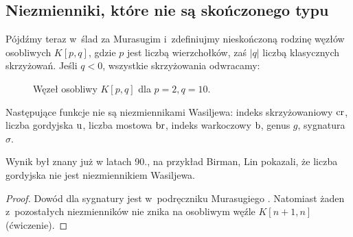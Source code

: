 
\subsection{Niezmienniki, które nie są skończonego typu}
Pójdźmy teraz w~ślad za Murasugim i~zdefiniujmy nieskończoną rodzinę węzłów osobliwych $K[p, q]$, gdzie $p$ jest liczbą wierzchołków, zaś $|q|$ liczbą klasycznych skrzyżowań.
Jeśli $q < 0$, wszystkie skrzyżowania odwracamy:
\begin{figure}[H]
    \centering
\begin{comment}
    \begin{tikzpicture}[baseline=-0.65ex, scale=0.1]
    \begin{knot}[clip width=5, end tolerance=1pt, flip crossing/.list={2}]
        \draw[thick] (5, 0) [in=-60, out=-120] to (-5, 0) [in=60, out=120] to (-15, 0) [in=-60, out=-120] to (-25, 0) [in=60, out=120] to (-35, 0) [in=180, out=-120] to (-35, -10);
        \draw[thick] (5, 0) [in=60, out=120] to (-5, 0) [in=-60, out=-120] to (-15, 0) [in=60, out=120] to (-25, 0) [in=-60, out=-120] to (-35, 0) [in=-180, out=120] to (-35, 10);
        \strand[thick] (5, 0) [in=120, out=60] to (15, 0) [in=-120, out=-60] to (25, 0) [in=120, out=60] to (35, 0) [in=0, out=-60] to (35, -10);
        \strand[thick] (5, 0) [in=-120, out=-60] to (15, 0) [in=120, out=60] to (25, 0) [in=-120, out=-60] to (35, 0) [in=0, out=60] to (35, 10);
        \draw[thick,Latex-] (-35, 10) to (35, 10);
        \draw[thick,Latex-] (-35, -10) to (35, -10);
        \draw[black,fill=black] (5,0) circle (0.5);
        \draw[black,fill=black] (-5,0) circle (0.5);
        \draw[black,fill=black] (-15,0) circle (0.5);
        \draw[black,fill=black] (-25,0) circle (0.5);
        \draw[black,fill=black] (-35,0) circle (0.5);
    \end{knot}
    \end{tikzpicture}
\end{comment}
    \caption{Węzeł osobliwy $K[p, q]$ dla $p = 2, q = 10$.}
\end{figure}

\begin{proposition}
%
%
%
%
%
%
    Następujące funkcje nie są niezmiennikami Wasiljewa: indeks skrzyżowaniowy $\operatorname{cr}$, liczba gordyjska $\operatorname{u}$, liczba mostowa $\operatorname{br}$, indeks warkoczowy $\operatorname{b}$, genus $g$, sygnatura $\sigma$.
\end{proposition}

Wynik był znany już w latach 90., na przykład Birman, Lin \cite{birman1993} pokazali, że liczba gordyjska nie jest niezmiennikiem Wasiljewa.
%
%

\begin{proof}
    Dowód dla sygnatury jest w~podręczniku Murasugiego \cite[s. 312]{murasugi1996}.
    Natomiast żaden z~pozostałych niezmienników nie znika na osobliwym węźle $K[n+1, n]$ (ćwiczenie).
\end{proof}

